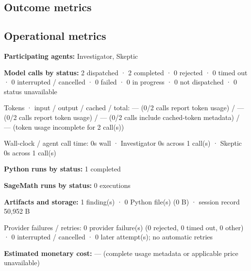 \documentclass[11pt]{article}
\begin{document}
\subsection{Outcome metrics}
\subsection{Operational metrics}
\textbf{Participating agents:} Investigator, Skeptic\par
\textbf{Model calls by status:} 2 dispatched · 2 completed · 0 rejected · 0 timed out · 0 interrupted / cancelled · 0 failed · 0 in progress · 0 not dispatched · 0 status unavailable\par
Tokens · input / output / cached / total: — (0/2 calls report token usage) / — (0/2 calls report token usage) / — (0/2 calls include cached-token metadata) / — (token usage incomplete for 2 call(s))\par
Wall-clock / agent call time: 0s wall · Investigator 0s across 1 call(s) · Skeptic 0s across 1 call(s)\par
\textbf{Python runs by status:} 1 completed\par
\textbf{SageMath runs by status:} 0 executions\par
\textbf{Artifacts and storage:} 1 finding(s) · 0 Python file(s) (0 B) · session record 50,952 B\par
Provider failures / retries: 0 provider failure(s) (0 rejected, 0 timed out, 0 other) · 0 interrupted / cancelled · 0 later attempt(s); no automatic retries\par
\textbf{Estimated monetary cost:} — (complete usage metadata or applicable price unavailable)\par
\end{document}
